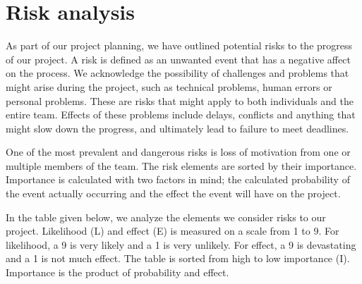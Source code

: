 \section{Risk analysis}
\label{sec:risk}
As part of our project planning, we have outlined potential risks to the progress of our project. A risk is defined as an unwanted event that has a negative affect on the process. We acknowledge the possibility of challenges and problems that might arise during the project, such as technical problems, human errors or personal problems. These are risks that might apply to both individuals and the entire team. Effects of these problems include delays, conflicts and anything that might slow down the progress, and ultimately lead to failure to meet deadlines. 

One of the most prevalent and dangerous risks is loss of motivation from one or multiple members of the team. The risk elements are sorted by their importance. Importance is calculated with two factors in mind; the calculated probability of the event actually occurring and the effect the event will have on the project. 

In the table given below, we analyze the elements we consider risks to our project. Likelihood (L) and effect (E) is measured on a scale from 1 to 9. For likelihood, a 9 is very likely and a 1 is very unlikely. For effect, a 9 is devastating and a 1 is not much effect. The table is sorted from high to low importance (I). Importance is the product of probability and effect. 
\newpage

